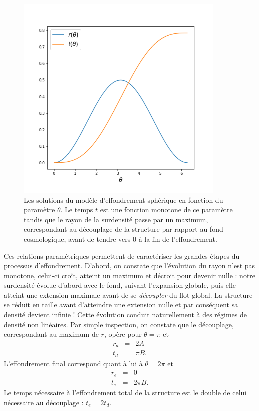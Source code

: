 \begin{figure}[htbp]
	\centering
		\includegraphics[height=10cm]{figs/rtparam.png}
		\caption[Les solutions paramétriques de l'effondrement sphérique]{Les solutions du modèle d'effondrement sphérique en fonction du paramètre $\theta$. Le temps $t$ est une fonction monotone de ce paramètre tandis que le rayon de la surdensité passe par un maximum, correspondant au découplage de la structure par rapport au fond cosmologique, avant de tendre vers 0 à la fin de l'effondrement.}
	\label{f:rtparam}
\end{figure}

Ces relations paramétriques permettent de caractériser les grandes étapes du processus d'effondrement. D'abord, on constate que l'évolution du rayon n'est pas monotone, celui-ci croît, atteint un maximum et décroit pour devenir nulle : notre surdensité évolue d'abord avec le fond, suivant l'expansion globale, puis elle atteint une extension maximale avant de se \textit{découpler} du flot global. La structure se réduit en taille avant d'atteindre une extension nulle et par conséquent sa densité devient infinie ! Cette évolution  conduit naturellement à des régimes de densité non linéaires. Par simple inspection, on constate que le découplage, correspondant au maximum de $r$, opère pour $\theta=\pi$ et 
\begin{eqnarray}
r_d&=&2A\\
t_d&=&\pi B.
\end{eqnarray}
L'effondrement final correspond quant à lui à $\theta=2 \pi$ et 
\begin{eqnarray}
r_e&=&0\\
t_e&=&2\pi B.
\end{eqnarray}
Le temps nécessaire à l'effondrement  total de la structure est le double de celui nécessaire au découplage : $t_e=2 t_d$.

